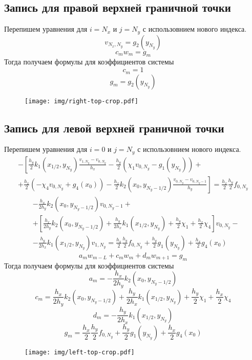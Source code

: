\subsection{Запись для правой верхней граничной точки}
Перепишем уравнения для $i = N_x$ и $j = N_y$ с использовнием нового индекса.
\[ v_{N_x,N_y} = g_2(y_{N_y}) \]
\[ c_m w_m = g_m \]
Тогда получаем формулы для коэффициентов системы
\[ c_m = 1 \]
\[ g_m = g_2(y_{N_y}) \]
\begin{figure}[H]
    \centering
    \texttt{[image: img/right-top-crop.pdf]}
\end{figure}

\subsection{Запись для левой верхней граничной точки}
Перепишем уравнения для $i = 0$ и $j = N_y$ с использовнием нового индекса.
\begin{multline*}
  - \left[
  \frac{h_y}{2} k_1(x_{1/2},y_{N_y}) \frac{v_{1,N_y} - v_{0,N_y}}{h_x} - \frac{h_y}{2} \left( \chi_1 v_{0,N_y} - g_1(y_{N_y}) \right) + \right. \\
  \left. +
  \frac{h_x}{2} \left( - \chi_4 v_{0,N_y} + g_4(x_0) \right) - \frac{h_x}{2} k_2(x_{0},y_{N_y-1/2}) \frac{v_{0,N_y} - v_{0,N_y-1}}{h_y}
  \right] =
  \frac{h_x}{2} \frac{h_y}{2} f_{0,N_y}
\end{multline*}
\[
\begin{split}
    &-\frac{h_x}{2 h_y} k_2(x_{0},y_{N_y-1/2}) v_{0,N_y-1} +\\
    &+\left[ \frac{h_x}{2 h_y} k_2(x_{0},y_{N_y-1/2}) + \frac{h_y}{2 h_x} k_1(x_{1/2},y_{N_y}) + \frac{h_y}{2} \chi_1 + \frac{h_x}{2} \chi_4 \right] v_{0,N_y} - \\
    &-\frac{h_y}{2 h_x} k_1(x_{1/2},y_{N_y}) v_{1,N_y} = \frac{h_x}{2} \frac{h_y}{2} f_{0,N_y} + \frac{h_y}{2} g_1(y_{N_y}) + \frac{h_x}{2} g_4(x_0)
\end{split}
\]
\[ a_m w_{m - L} + c_m w_m + d_m w_{m + 1} = g_m \]
Тогда получаем формулы для коэффициентов системы
\[ a_m = -\frac{h_x}{2 h_y} k_2(x_{0},y_{N_y-1/2}) \]
\[ c_m = \frac{h_x}{2 h_y} k_2(x_{0},y_{N_y-1/2}) + \frac{h_y}{2 h_x} k_1(x_{1/2},y_{N_y}) + \frac{h_y}{2} \chi_1 + \frac{h_x}{2} \chi_4 \]
\[ d_m = -\frac{h_y}{2 h_x} k_1(x_{1/2},y_{N_y}) \]
\[ g_m = \frac{h_x}{2} \frac{h_y}{2} f_{0,N_y} + \frac{h_y}{2} g_1(y_{N_y}) + \frac{h_x}{2} g_4(x_0) \]
\begin{figure}[H]
    \centering
    \texttt{[image: img/left-top-crop.pdf]}
\end{figure}

